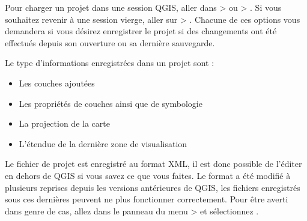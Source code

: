 Pour charger un projet dans une session QGIS, aller dans  >  ou  > . Si vous souhaitez revenir à une session vierge, aller sur  > .
Chacune de ces options vous demandera si vous désirez enregistrer le projet si des changements ont été effectués depuis son ouverture ou sa dernière sauvegarde.

Le type d'informations enregistrées dans un projet sont :

\begin{itemize}
\item Les couches ajoutées
\item Les propriétés de couches ainsi que de symbologie
\item La projection de la carte
\item L'étendue de la dernière zone de visualisation
\end{itemize}
%


Le fichier de projet est enregistré au format XML, il est donc possible de l'éditer en dehors de QGIS si vous savez ce que vous faites. Le format a été modifié à plusieurs reprises depuis les versions antérieures de QGIS, les fichiers enregistrés sous ces dernières peuvent ne plus fonctionner correctement. Pour être averti dans genre de cas, allez dans le panneau  du menu  >  
et sélectionnez .


